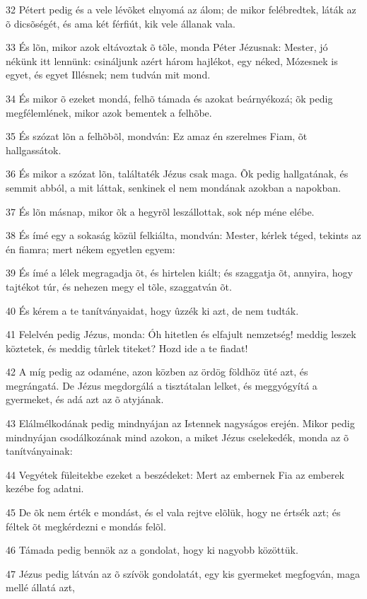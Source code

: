 \par 32 Pétert pedig és a vele lévõket elnyomá az álom; de mikor felébredtek, láták az õ dicsõségét, és ama két férfiút, kik vele állanak vala.
\par 33 És lõn, mikor azok eltávoztak õ tõle, monda Péter Jézusnak: Mester, jó nékünk itt lennünk: csináljunk azért három hajlékot, egy néked, Mózesnek is egyet, és egyet Illésnek; nem tudván mit mond.
\par 34 És mikor õ ezeket mondá, felhõ támada és azokat beárnyékozá; õk pedig megfélemlének, mikor azok bementek a felhõbe.
\par 35 És szózat lõn a felhõbõl, mondván: Ez amaz én szerelmes Fiam, õt hallgassátok.
\par 36 És mikor a szózat lõn, találtaték Jézus csak maga. Õk pedig hallgatának, és semmit abból, a mit láttak, senkinek el nem mondának azokban a napokban.
\par 37 És lõn másnap, mikor õk a hegyrõl leszállottak, sok nép méne elébe.
\par 38 És ímé egy a sokaság közül felkiálta, mondván: Mester, kérlek téged, tekints az én fiamra; mert nékem egyetlen egyem:
\par 39 És ímé a lélek megragadja õt, és hirtelen kiált; és szaggatja õt, annyira, hogy tajtékot túr, és nehezen megy el tõle, szaggatván õt.
\par 40 És kérem a te tanítványaidat, hogy ûzzék ki azt, de nem tudták.
\par 41 Felelvén pedig Jézus, monda: Óh hitetlen és elfajult nemzetség! meddig leszek köztetek, és meddig tûrlek titeket? Hozd ide a te fiadat!
\par 42 A míg pedig az odaméne, azon közben az ördög földhöz üté azt, és megrángatá. De Jézus megdorgálá a tisztátalan lelket, és meggyógyítá a gyermeket, és adá azt az õ atyjának.
\par 43 Elálmélkodának pedig mindnyájan az Istennek nagyságos erején. Mikor pedig mindnyájan csodálkozának mind azokon, a miket Jézus cselekedék, monda az õ tanítványainak:
\par 44 Vegyétek füleitekbe ezeket a beszédeket: Mert az embernek Fia az emberek kezébe fog adatni.
\par 45 De õk nem érték e mondást, és el vala rejtve elõlük, hogy ne értsék azt; és féltek õt megkérdezni e mondás felõl.
\par 46 Támada pedig bennök az a gondolat, hogy ki nagyobb közöttük.
\par 47 Jézus pedig látván az õ szívök gondolatát, egy kis gyermeket megfogván, maga mellé állatá azt,
